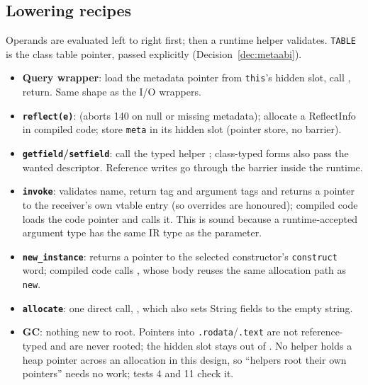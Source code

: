\documentclass[10pt]{article}
\newcommand{\code}[1]{\texttt{\small #1}}
\begin{document}
\subsection{Lowering recipes}\label{sec:lo5-lowering}
Operands are evaluated left to right first; then a runtime helper validates. \code{TABLE} is the class table pointer, passed explicitly (Decision~\ref{dec:metaabi}).
\begin{itemize}
\item \textbf{Query wrapper}: load the metadata pointer from \code{this}'s hidden slot, call , return. Same shape as the I/O wrappers.
\item \textbf{\code{reflect(e)}}:  (aborts 140 on null or missing metadata); allocate a ReflectInfo in compiled code; store \code{meta} in its hidden slot (pointer store, no barrier).
\item \textbf{\code{getfield}/\code{setfield}}: call the typed helper ; class-typed forms also pass the wanted descriptor. Reference writes go through the barrier inside the runtime.
\item \textbf{\code{invoke}}:  validates name, return tag and argument tags and returns a pointer to the receiver's own vtable entry (so overrides are honoured); compiled code loads the code pointer and calls it. This is sound because a runtime-accepted argument type has the same IR type as the parameter.
\item \textbf{\code{new\_instance}}:  returns a pointer to the selected constructor's \code{construct} word; compiled code calls , whose body reuses the same allocation path as \code{new}.
\item \textbf{\code{allocate}}: one direct call, , which also sets String fields to the empty string.
\item \textbf{GC}: nothing new to root. Pointers into \code{.rodata}/\code{.text} are not reference-typed and are never rooted; the hidden slot stays out of . No helper holds a heap pointer across an allocation in this design, so ``helpers root their own pointers'' needs no work; tests 4 and 11 check it.
\end{itemize}
\end{document}
